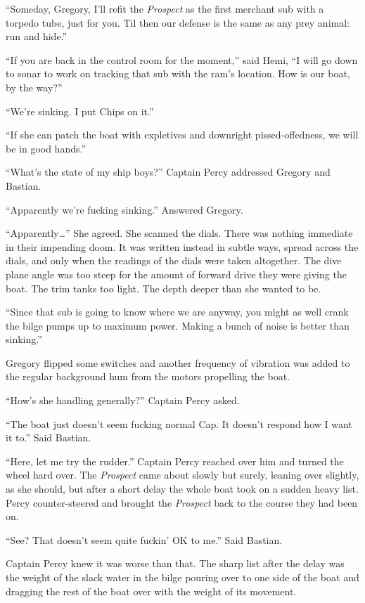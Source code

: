 \documentclass[]{article}
\begin{document}
\begin{multicols}{2}
``Someday, Gregory, I'll refit the \emph{Prospect} as the first merchant
sub with a torpedo tube, just for you. Til then our defense is the same
as any prey animal: run and hide.''

``If you are back in the control room for the moment,'' said Hemi, ``I
will go down to sonar to work on tracking that sub with the ram's
location. How is our boat, by the way?''

``We're sinking. I put Chips on it.''

``If she can patch the boat with expletives and downright
pissed-offedness, we will be in good hands.''

``What's the state of my ship boys?'' Captain Percy addressed Gregory
and Bastian.

``Apparently we're fucking sinking.'' Answered Gregory.

``Apparently\ldots{}'' She agreed. She scanned the dials. There was
nothing immediate in their impending doom. It was written instead in
subtle ways, spread across the dials, and only when the readings of the
dials were taken altogether. The dive plane angle was too steep for the
amount of forward drive they were giving the boat. The trim tanks too
light. The depth deeper than she wanted to be.

``Since that sub is going to know where we are anyway, you might as well
crank the bilge pumps up to maximum power. Making a bunch of noise is
better than sinking.''

Gregory flipped some switches and another frequency of vibration was
added to the regular background hum from the motors propelling the boat.

``How's she handling generally?'' Captain Percy asked.

``The boat just doesn't seem fucking normal Cap. It doesn't respond how
I want it to.'' Said Bastian.

``Here, let me try the rudder.'' Captain Percy reached over him and
turned the wheel hard over. The \emph{Prospect} came about slowly but
surely, leaning over slightly, as she should, but after a short delay
the whole boat took on a sudden heavy list. Percy counter-steered and
brought the \emph{Prospect} back to the course they had been on.

``See? That doesn't seem quite fuckin' OK to me.'' Said Bastian.

Captain Percy knew it was worse than that. The sharp list after the
delay was the weight of the slack water in the bilge pouring over to one
side of the boat and dragging the rest of the boat over with the weight
of its movement.


\end{multicols}
\end{document}
